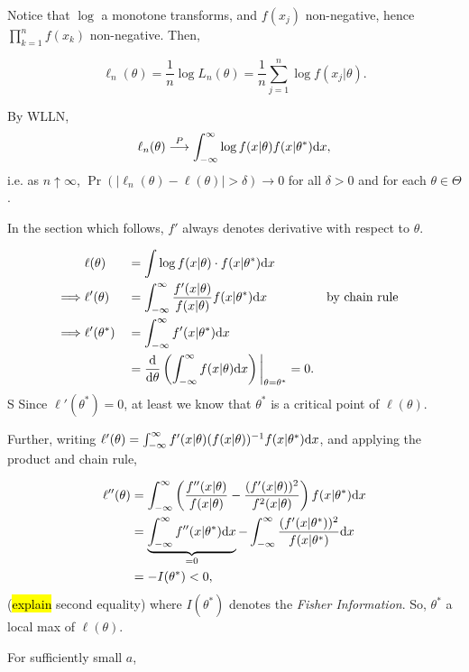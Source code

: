 \documentclass[12pt]{article}  \usepackage{algorithm2e} \usepackage{amsmath} \usepackage{amsthm} \usepackage{amsfonts} \usepackage{bbm} \usepackage{color,soul} \usepackage{framed} \usepackage[margin=0.5in]{geometry} \usepackage{hyperref} \usepackage{mathtools} \usepackage[dvipsnames]{xcolor}
\begin{document}
Notice that $\log$ a monotone transforms, and $f(x_j)$ non-negative,
hence $\prod_{k=1}^n f(x_k)$ non-negative. Then,

\[
\ell_n(\theta) = \frac{1}{n} \log L_n (\theta) = \frac{1}{n} \sum_{j=1}^n \log f(x_j|\theta).
\]

By WLLN,
\[
\ell_n(\theta) \overset{P}{\longrightarrow} \int_{-\infty}^\infty \log f(x|\theta) f(x|\theta^*) \mathrm{d} x,
\]
i.e. as $n \uparrow \infty$, $\Pr(|\ell_n (\theta) - \ell(\theta)| > \delta) \longrightarrow 0$ for all $\delta > 0$ and for each $\theta \in \Theta$.

In the section which follows, $f'$ always denotes derivative with 
respect to $\theta$.

\begin{alignat*}{5}
&\ell(\theta) &&= \int \log f(x|\theta) \cdot f(x|\theta^*) \mathrm{d} x \\
\implies &\ell '(\theta) &&= \int_{-\infty}^\infty \frac{f'(x|\theta)}{f(x|\theta)} f(x|\theta^*) \mathrm{d} x &&\textrm{by chain rule} \\
\implies &\ell '(\theta^*) &&= \int_{-\infty}^\infty f'(x|\theta^*) \mathrm{d} x \\
&                 &&= \frac{\mathrm{d}}{\mathrm{d} \theta} \left( \int_{-\infty}^\infty f(x|\theta) \mathrm{d} x \right) \bigg|_{\theta = \theta^*} = 0. \end{alignat*}
S
Since $\ell'(\theta^*) = 0$, at least we know that $\theta^*$ is a 
critical point of $\ell(\theta)$.

Further, writing $\ell'(\theta) = \int_{-\infty}^\infty f'(x|\theta) (f(x|\theta))^{-1} f(x|\theta^*) \mathrm{d} x$, and applying the product and chain rule,

\begin{align*}   \ell ''(\theta) &= \int_{-\infty}^\infty \left( \frac{f''(x|\theta)}{f(x|\theta)} - \frac{(f'(x|\theta))^2}{f^2(x|\theta)} \right) f(x|\theta^*) \mathrm{d} x \\
                 &= \underbrace{ \int_{-\infty}^\infty f''(x|\theta^*) \mathrm{d} x}_{=0} - \int_{-\infty}^\infty \frac{(f'(x|\theta^*))^2}{f(x|\theta^*)} \mathrm{d} x\\
                 &= -I(\theta^*) < 0, \end{align*}
(\hl{explain} second equality)
where $I(\theta^*)$ denotes the \emph{Fisher Information}. So,
$\theta^*$ a local max of $\ell (\theta)$.

For sufficiently small $a$,
\end{document}
